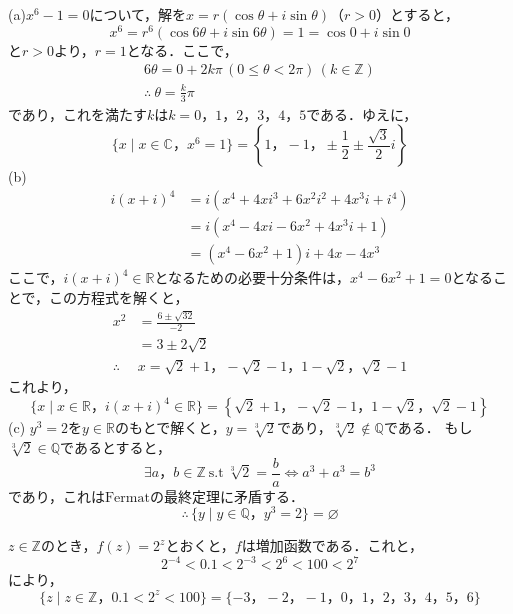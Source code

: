 \documentclass[dvipdfmx,uplatex,11pt]{jsarticle}
\begin{document}
\begin{leftbar}
    (a)\quad $x^6 -1 =0$について，解を$x=r(\cos \theta + i \sin \theta)$（$r>0$）とすると，
    \[
        x^6 = r^6 (\cos 6 \theta + i \sin 6 \theta)=1 =\cos 0 + i \sin 0
    \]
    と$r>0$より，$r=1$となる．ここで，
    \begin{gather*}
        6 \theta = 0 + 2k\pi \, (0 \le \theta <2 \pi ) \, (k \in \mathbb{Z}) \\
        \therefore ~ \theta =\frac{k}{3}\pi 
    \end{gather*}
    であり，これを満たす$k$は$k=0，1，2，3，4，5$である．ゆえに，
    \[
        \{x \mid x \in \mathbb{C}，x^6=1\} = \left \{1，-1，\pm \frac{1}{2} \pm \frac{\sqrt{3}}{2} i \right \}
    \]
    (b) 
    \begin{align*}
    i(x+i)^4&=i(x^4 + 4 x i^3 +6 x^2 i^2 + 4x^3 i +i^4) \\
    & = i(x^4 -4 xi -6x^2 + 4x^3 i+1) \\
    & = (x^4-6x^2+1)i + 4x-4x^3
    \end{align*}
    ここで，$i(x+i)^4 \in \mathbb{R}$となるための必要十分条件は，$x^4-6x^2+1=0$となることで，この方程式を解くと，
    \begin{align*}
        x^2 &= \frac{6\pm \sqrt{32}}{-2} \\
        & = 3 \pm 2 \sqrt{2} \\
        \therefore & x= \sqrt{2}+1 ，-\sqrt{2}-1，1-\sqrt{2}，\sqrt{2}-1
    \end{align*}
    これより，
    \[
        \{x \mid x \in \mathbb{R}，i(x+i)^4 \in \mathbb{R}\} = \left \{  \sqrt{2}+1 ，-\sqrt{2}-1，1-\sqrt{2}，\sqrt{2}-1 \right \}
        \]
(c) \quad $y^3 =2$を$y \in \mathbb{R}$のもとで解くと，$y=\sqrt[3]{2}$であり，$\sqrt[3]{2} \notin \mathbb{Q}$である．
もし$\sqrt[3]{2} \in \mathbb{Q}$であるとすると，
\[
    \exists a，b \in \mathbb{Z} ~ \mathrm{s.t} ~ \sqrt[3]{2} = \frac{b}{a} \iff a^3 + a^3=b^3
\]
であり，これは$\mathrm{Fermat}$の最終定理に矛盾する．
\[
    \therefore \, \{y \mid y \in \mathbb{Q}，y^3=2 \} = \varnothing
\]
\end{leftbar}
\begin{leftbar}
    $z \in \mathbb{Z}$のとき，$f(z)=2^z$とおくと，$f$は増加函数である．これと，
    \[
        2^{-4} < 0.1 < 2^{-3} < 2^6<100<2^7
    \]
    により，
    \[
        \{z \mid z \in \mathbb{Z}，0.1<2^z<100\} = \{-3，-2，-1，0，1，2，3，4，5，6\}
    \]
\end{leftbar}
\end{document}
